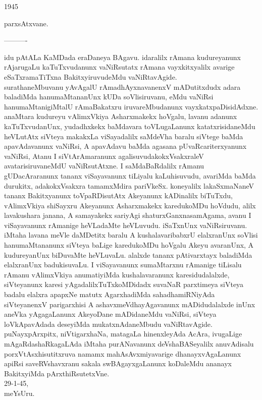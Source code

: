 \documentclass{article}
\begin{document}
\begin{center}
1945
\end{center}

\begin{center}
parxsAtxvane.
\end{center}

\begin{center}
----------
\end{center}

idu pAtALa KaMDada eraDaneya BAgavu. idaralilx rAmana kudureyanunx rAjarugaLu kaTuTxvudanunx vaNiRsutatx rAmana vayxkitxyalilx avarige eSaTxramaTiTxna BakitxyiruvudeMdu vaNiRtavAgide.\\
surathaneMbuvanu yAvAgalU rAmadhAyxnavanenxV mADutitxdudx adara baladiMda hanumaMtananUnx kUDa soVlisiruvanu, eMdu vaNiRsi hanumaMtanigiMtalU rAmaBakatxru iruvareMbudanunx vayxkatxpaDisidAdxne.\\
anaMtara kudureyu vAlimxVkiya Asharxmakekx hoVgalu, lavanu adanunx kaTuTxvudanUnx, yudadhxkekx baMdavara toVLugaLanunx katatxrisidaneMdu heVLutAtx siVteya makakxLa viSayadalilx saMdeVha baralu siVtege baMda apavAdavanunx vaNiRsi, A apavAdavu baMda agasana pUvaRcariterxyanunx vaNiRsi, Atanu I siVtArAmaranunx agalisuvudakokxVsakxraleV avatarisiruvaneMdU vaNiRsutAtxne. I saMdaBaRdalilx rAmanu gUDacAraranunx tananx viSayavanunx tiLiyalu kaLuhisuvudu, avariMda baMda durukitx, adakokxVsakxra tamamxMdira pariVkeSx. koneyalilx lakaSxmaNaneV tananx Bakitxyanunx toVpaRDisutAtx Akeyanunx  kADinalilx biTuTxdu, vAlimxVkiya shiSayxru Akeyanunx Asharxmakekx karedukoMDu hoVdudu, alilx lavakushara janana, A samayakekx sariyAgi shaturxGanxnasamAgama, avanu I viSayavanunx rAmanige heVLadaMte heVLuvudu. iSaTxnUnx vaNiRsiruvanu. iMtaha lavana meVle  daMDetitx baralu A kushalavaribabxrU elalxranUnx soVlisi hanumaMtananunx siVteya baLige karedukoMDu hoVgalu Akeyu avaranUnx, A kudureyanUnx biDuvaMte heVLuvaLu. alalxde tananx pAtivarxtayx baladiMda elalxranUnx badukisuvaLu. I viSayavanunx sumaMtarxnu rAmanige tiLisalu rAmanu vAlimxVkiya anumatiyiMda kushalavaranunx karesidudalalxde, siVteyanunx karesi yAgadalilxTuTxkoMDidadx suvaNaR parxtimeya siVteya badalu elalxra apapxNe matutx AgarxhadiMda sahadhamiRNiyAda siVteyanenxV parigarxhisi A ashavxmeVdhayAgavanunx mADidudalalxde inUnx aneVka yAgagaLanunx AkeyoDane mADidaneMdu vaNiRsi, siVteya loVkApavAdada deseyiMda mukatxnAdaneMbudu vaNiRtavAgide.\\
puNayxpArxpitx, niVtigarxhaNa, matagaLa hinenxleyAda AcAra, ivugaLige mAgaRdashaRkagaLAda iMtaha purANavanunx deVshaBASeyalilx anuvAdisalu porxVtAsxhisutitxruva namamx mahAsAvxmiyavarige dhanayxvAgaLanunx apiRsi saveRVshavxranu sakala swBAgayxgaLanunx koDaleMdu ananayx BakitxyiMda pArxthiRsutetxVne.\\
29-1-45,\\
meYsUru.\\
\end{document}
